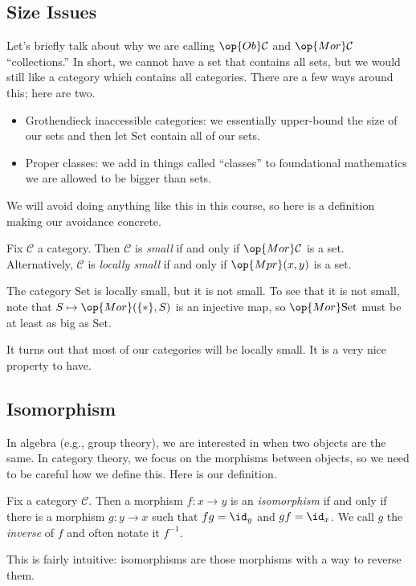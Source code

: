 \documentclass[../notes.tex]{subfiles}
\begin{document}
\subsection{Size Issues}
Let's briefly talk about why we are calling $\op{Ob}\mathcal C$ and $\op{Mor}\mathcal C$ ``collections.'' In short, we cannot have a set that contains all sets, but we would still like a category which contains all categories. There are a few ways around this; here are two.
\begin{itemize}
	\item Grothendieck inaccessible categories: we essentially upper-bound the size of our sets and then let $\mathrm{Set}$ contain all of our sets.
	\item Proper classes: we add in things called ``classes'' to foundational mathematics we are allowed to be bigger than sets.
\end{itemize}
We will avoid doing anything like this in this course, so here is a definition making our avoidance concrete.
\begin{definition}
	Fix $\mathcal C$ a category. Then $\mathcal C$ is \textit{small} if and only if $\op{Mor}\mathcal C$ is a set. Alternatively, $\mathcal C$ is \textit{locally small} if and only if $\op{Mpr}(x,y)$ is a set.
\end{definition}
\begin{example}
	The category $\mathrm{Set}$ is locally small, but it is not small. To see that it is not small, note that $S\mapsto\op{Mor}(\{*\},S)$ is an injective map, so $\op{Mor}\mathrm{Set}$ must be at least as big as $\mathrm{Set}$.
\end{example}
It turns out that most of our categories will be locally small. It is a very nice property to have.

\subsection{Isomorphism}
In algebra (e.g., group theory), we are interested in when two objects are the same. In category theory, we focus on the morphisms between objects, so we need to be careful how we define this. Here is our definition.
\begin{definition}[Isomorphism]
	Fix a category $\mathcal C$. Then a morphism $f:x\to y$ is an \textit{isomorphism} if and only if there is a morphism $g:y\to x$ such that $fg=\id_y$ and $gf=\id_x$. We call $g$ the \textit{inverse} of $f$ and often notate it $f^{-1}$.
\end{definition}
\noindent This is fairly intuitive: isomorphisms are those morphisms with a way to reverse them.
\end{document}
